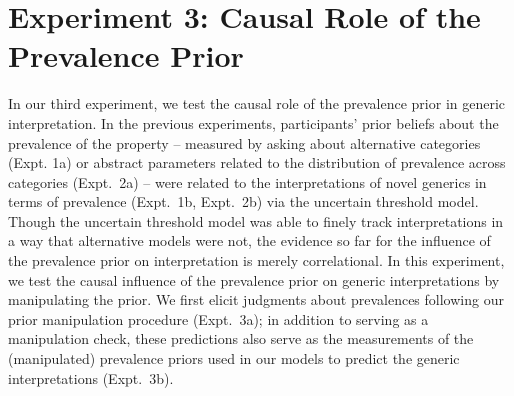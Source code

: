 \documentclass[floatsintext,doc]{apa6}
\begin{document}






\hypertarget{experiment-3-prior-manipulation}{%
\section{Experiment 3: Causal Role of the Prevalence Prior}\label{experiment-3-prior-manipulation}}

In our third experiment, we test the causal role of the prevalence prior in generic interpretation.
In the previous experiments, participants' prior beliefs about the prevalence of the property -- measured by asking about alternative categories (Expt. 1a) or abstract parameters related to the distribution of prevalence across categories (Expt.~2a) -- were related to the interpretations of novel generics in terms of prevalence (Expt.~1b, Expt.~2b) via the uncertain threshold model.
Though the uncertain threshold model was able to finely track interpretations in a way that alternative models were not, the evidence so far for the influence of the prevalence prior on interpretation is merely correlational.
In this experiment, we test the causal influence of the prevalence prior on generic interpretations by manipulating the prior.
We first elicit judgments about prevalences following our prior manipulation procedure (Expt.~3a); in addition to serving as a manipulation check, these predictions also serve as the measurements of the (manipulated) prevalence priors used in our models to predict the generic interpretations (Expt.~3b).
\end{document}
